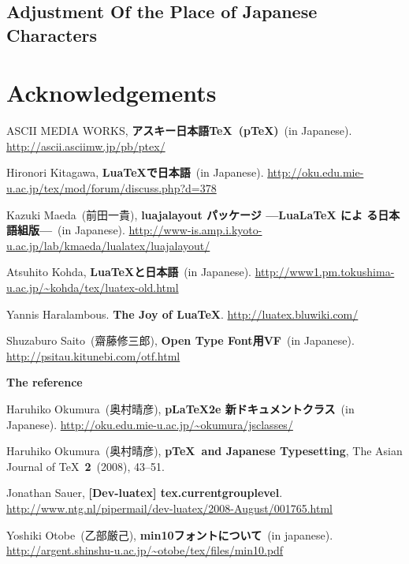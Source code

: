 \documentclass{ajt}
\begin{document}
\subsection{Adjustment Of the Place of Japanese Characters}
\label{ssec-width}


\section*{Acknowledgements}


\providecommand{\bysame}{\leavevmode\hbox to3em{\hrulefill}\thinspace}
\providecommand{\href}[2]{#2}
\begin{thebibliography}{99}


ASCII MEDIA WORKS, \textbf{アスキー日本語\TeX\ (p\TeX)}\ (in
	Japanese). \url{http://ascii.asciimw.jp/pb/ptex/}


Hironori Kitagawa, \textbf{LuaTeXで日本語}\ (in
	Japanese). \url{http://oku.edu.mie-u.ac.jp/tex/mod/forum/discuss.php?d=378}

Kazuki Maeda\ (前田一貴), \textbf{luajalayout パッケージ —LuaLaTeX によ
	る日本語組版—}\ (in Japanese).
\url{http://www-is.amp.i.kyoto-u.ac.jp/lab/kmaeda/lualatex/luajalayout/}

Atsuhito Kohda, \textbf{LuaTeXと日本語}\ (in
	Japanese). \url{http://www1.pm.tokushima-u.ac.jp/~kohda/tex/luatex-old.html}

Yannis Haralambous. \textbf{The Joy of LuaTeX}. \url{http://luatex.bluwiki.com/}

Shuzaburo Saito\ (齋藤修三郎), \textbf{Open Type Font用VF}\ (in Japanese).
\url{http://psitau.kitunebi.com/otf.html}

\textbf{The \LuaTeX reference}

Haruhiko Okumura\ (奥村晴彦), \textbf{pLaTeX2e 新ドキュメントクラス}\
	(in
	Japanese). \url{http://oku.edu.mie-u.ac.jp/~okumura/jsclasses/}

Haruhiko Okumura\ (奥村晴彦), \textbf{p\TeX\ and Japanese Typesetting},
	The Asian Journal of \TeX\ \textbf{2}~(2008), 43--51.

Jonathan Sauer, \textbf{[Dev-luatex] tex.currentgrouplevel}. 
\url{http://www.ntg.nl/pipermail/dev-luatex/2008-August/001765.html}

Yoshiki Otobe\ (乙部厳己), \textbf{min10フォントについて}\ (in japanese).
\url{http://argent.shinshu-u.ac.jp/~otobe/tex/files/min10.pdf}
\end{thebibliography}
\end{document}
